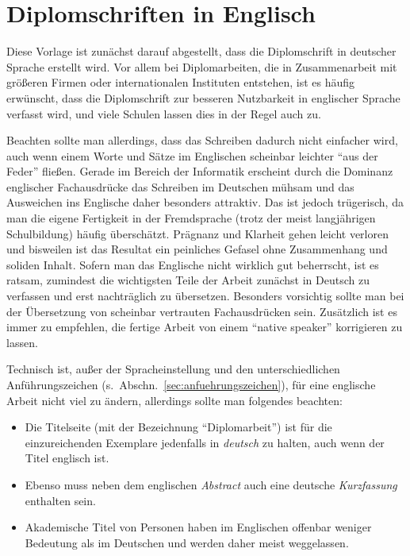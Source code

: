 \section{Diplomschriften in Englisch}
\label{sec:englisch}

Diese Vorlage ist zunächst darauf abgestellt, dass die
Diplomschrift in deutscher Sprache erstellt wird. Vor allem bei
Diplomarbeiten, die in Zusammenarbeit mit größeren Firmen oder
internationalen Instituten entstehen, ist es häufig erwünscht,
dass die Diplomschrift zur besseren Nutzbarkeit in englischer
Sprache verfasst wird, und viele Schulen lassen dies in
der Regel auch zu.

Beachten sollte man allerdings, dass das Schreiben dadurch nicht
einfacher wird, auch wenn einem Worte und Sätze im Englischen
scheinbar leichter "`aus der Feder"' fließen. Gerade im Bereich
der Informatik erscheint durch die Dominanz englischer
Fachausdrücke das Schreiben im Deutschen mühsam und das Ausweichen
ins Englische daher besonders attraktiv. Das ist jedoch
trügerisch, da man die eigene Fertigkeit in der Fremdsprache
(trotz der meist langjährigen Schulbildung) häufig überschätzt.
Prägnanz und Klarheit gehen leicht verloren und bisweilen ist das
Resultat ein peinliches Gefasel ohne Zusammenhang und soliden
Inhalt. Sofern man das Englische nicht wirklich gut beherrscht, ist
es ratsam, zumindest die wichtigsten Teile der Arbeit zunächst in
Deutsch zu verfassen und erst nachträglich zu übersetzen.
Besonders vorsichtig sollte man bei der Übersetzung von scheinbar
vertrauten Fachausdrücken sein. Zusätzlich ist es immer zu
empfehlen, die fertige Arbeit von einem "`native speaker"'
korrigieren zu lassen.



Technisch ist, außer der Spracheinstellung und den
unterschiedlichen Anführungszeichen (s.\
Abschn.~\ref{sec:anfuehrungszeichen}), für eine englische Arbeit
nicht viel zu ändern, allerdings sollte man folgendes beachten:
%
\begin{itemize}
\item  Die Titelseite (mit der Bezeichnung "`Diplomarbeit"') 
ist für die einzureichenden Exemplare jedenfalls in \emph{deutsch} zu halten,
auch wenn der Titel englisch ist. 
\item Ebenso muss neben dem
englischen \emph{Abstract} auch eine deutsche \emph{Kurzfassung}
enthalten sein. %
\item Akademische Titel von Personen haben im Englischen offenbar
weniger Bedeutung als im Deutschen und werden daher meist
weggelassen.
\end{itemize}
